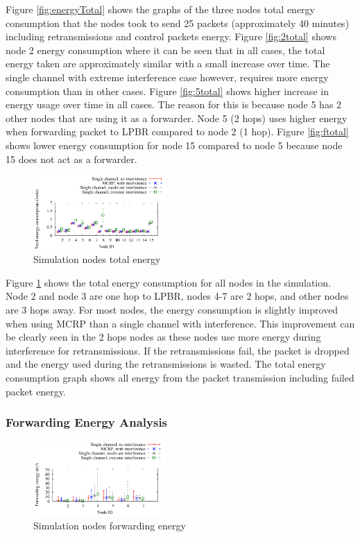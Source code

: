 Figure \ref{fig:energyTotal} shows the graphs of the three nodes total energy consumption that the nodes took to send 25 packets (approximately 40 minutes) including retransmissions and control packets energy. Figure \ref{fig:2total} shows node 2 energy consumption where it can be seen that in all cases, the total energy taken are approximately similar with a small increase over time. The single channel with extreme interference case however, requires more energy consumption than in other cases. Figure \ref{fig:5total} shows higher increase in energy usage over time in all cases. The reason for this is because node 5 has 2 other nodes that are using it as a forwarder. Node 5 (2 hops) uses higher energy when forwarding packet to LPBR compared to node 2 (1 hop). Figure \ref{fig:ftotal} shows lower energy consumption for node 15 compared to node 5 because node 15 does not act as a forwarder.

\begin{figure}
\centering
\includegraphics[width=0.45\textwidth]{figures/totalEnergy.pdf}
\caption{Simulation nodes total energy}
\label{fig:allNodesEnergy}
\end{figure}

Figure \ref{fig:allNodesEnergy} shows the total energy consumption for all nodes in the simulation. Node 2 and node 3 are one hop to LPBR, nodes 4-7 are 2 hops, and other nodes are 3 hops away. For most nodes, the energy consumption is slightly improved when using MCRP than a single channel with interference. This improvement can be clearly seen in the 2 hops nodes as these nodes use more energy during interference for retransmissions. If the retransmissions fail, the packet is dropped and the energy used during the retransmissions is wasted. The total energy consumption graph shows all energy from the packet transmission including failed packet energy.

\subsubsection{Forwarding Energy Analysis}

\begin{figure}
\centering
\includegraphics[width=0.45\textwidth]{figures/fwdEnergy.pdf}
\caption{Simulation nodes forwarding energy}
\label{fig:allNodesFwdEnergy}
\end{figure}

